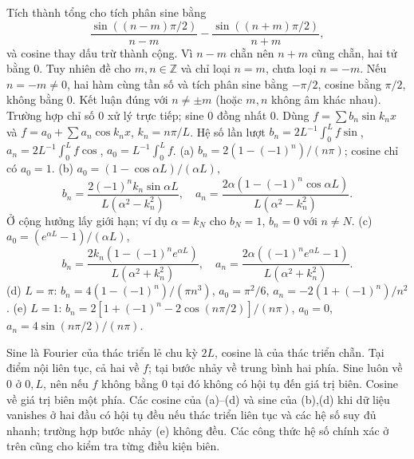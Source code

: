 Tích thành tổng cho tích phân sine bằng
\[\frac{\sin((n-m)\pi/2)}{n-m}-\frac{\sin((n+m)\pi/2)}{n+m},\]
và cosine thay dấu trừ thành cộng. Vì $n-m$ chẵn nên $n+m$ cũng chẵn, hai tử bằng 0. Tuy nhiên đề cho $m,n\in\mathbb Z$ và chỉ loại $n=m$, chưa loại $n=-m$. Nếu $n=-m\ne0$, hai hàm cùng tần số và tích phân sine bằng $-\pi/2$, cosine bằng $\pi/2$, không bằng 0. Kết luận đúng với $n\ne\pm m$ (hoặc $m,n$ không âm khác nhau). Trường hợp chỉ số 0 xử lý trực tiếp; sine 0 đồng nhất 0.
Dùng $f=\sum b_n\sin k_nx$ và $f=a_0+\sum a_n\cos k_nx$, $k_n=n\pi/L$. Hệ số lần lượt $b_n=2L^{-1}\int_0^Lf\sin$, $a_n=2L^{-1}\int_0^Lf\cos$, $a_0=L^{-1}\int_0^Lf$.
(a) $b_n=2(1-(-1)^n)/(n\pi)$; cosine chỉ có $a_0=1$.
(b) $a_0=(1-\cos\alpha L)/(\alpha L)$,
\[b_n=\frac{2(-1)^nk_n\sin\alpha L}{L(\alpha^2-k_n^2)},\quad a_n=\frac{2\alpha(1-(-1)^n\cos\alpha L)}{L(\alpha^2-k_n^2)}.\]
Ở cộng hưởng lấy giới hạn; ví dụ $\alpha=k_N$ cho $b_N=1$, $b_n=0$ với $n\ne N$.
(c) $a_0=(e^{\alpha L}-1)/(\alpha L)$,
\[b_n=\frac{2k_n(1-(-1)^ne^{\alpha L})}{L(\alpha^2+k_n^2)},\quad a_n=\frac{2\alpha((-1)^ne^{\alpha L}-1)}{L(\alpha^2+k_n^2)}.\]
(d) $L=\pi$: $b_n=4(1-(-1)^n)/(\pi n^3)$, $a_0=\pi^2/6$, $a_n=-2(1+(-1)^n)/n^2$.
(e) $L=1$: $b_n=2[1+(-1)^n-2\cos(n\pi/2)]/(n\pi)$, $a_0=0$, $a_n=4\sin(n\pi/2)/(n\pi)$.

Sine là Fourier của thác triển lẻ chu kỳ $2L$, cosine là của thác triển chẵn. Tại điểm nội liên tục, cả hai về $f$; tại bước nhảy về trung bình hai phía. Sine luôn về 0 ở $0,L$, nên nếu $f$ không bằng 0 tại đó không có hội tụ đến giá trị biên. Cosine về giá trị biên một phía. Các cosine của (a)--(d) và sine của (b),(d) khi dữ liệu vanishes ở hai đầu có hội tụ đều nếu thác triển liên tục và các hệ số suy đủ nhanh; trường hợp bước nhảy (e) không đều. Các công thức hệ số chính xác ở trên cũng cho kiểm tra từng điều kiện biên.
